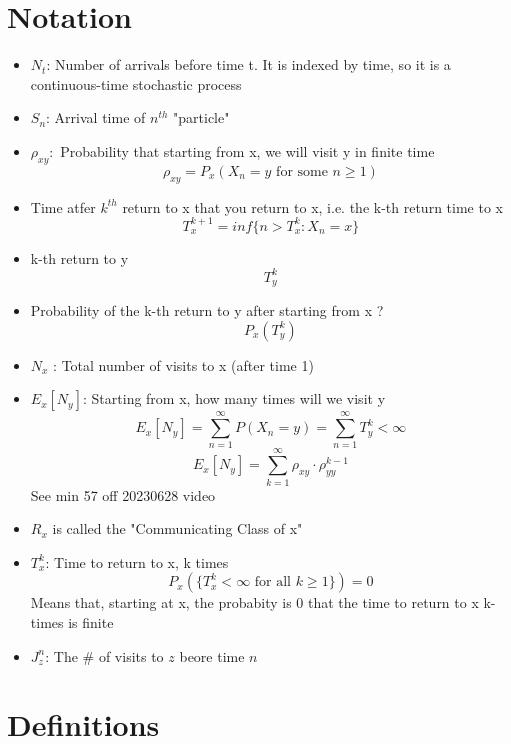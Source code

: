 \documentclass{report}
\begin{document}
\chapter*{Notation}%
  \begin{itemize}
      \item $N_t$: Number of arrivals before time t.  It is indexed by
        time, so it is a continuous-time stochastic process
      \item $S_n$: Arrival time of $n^{th}$ "particle"
      \item $\rho_{xy}: $ Probability that starting from x, we will visit y in finite time
        \[ \rho_{xy} = P_x(X_n = y \text{ for some  } n \geq 1) \]
      \item Time atfer $k^{th}$ return to x that you return to x, i.e. the k-th return time to x
        \[ T^{k+1}_x = inf \{n > T_x^k : X_n = x \}  \]
      \item k-th return to y
        \[ T^k_y \]
      \item Probability of the k-th return to y after starting from x ?
        \[ P_x(T^k_y) \]
      \item $N_x$ : Total number of visits to x (after time 1)
      \item $E_x[N_y]$: Starting from x, how many times will we visit y
          \[ E_x[N_y] = \sum^{\infty}_{n=1} P(X_n=y) = \sum^{\infty}_{n=1} T_y^k < \infty  \]
          \[ E_x[N_y] = \sum^{\infty}_{k=1} \rho_{xy} \cdot \rho^{k-1}_{yy}   \]
            See min 57 off 20230628 video
      \item $R_x$ is called the "Communicating Class of x"
      \item $T^k_x$: Time to return to x, k times
        \[ P_x(\{T^k_x < \infty \text{ for all } k \geq 1\}) = 0 \]
        Means that, starting at x, the probabity is 0 that the time to return to x k-times is finite
      \item $J_z^n$: The \# of visits to $z$ beore time $n$
  \end{itemize}

\chapter*{Definitions}%
\end{document}
